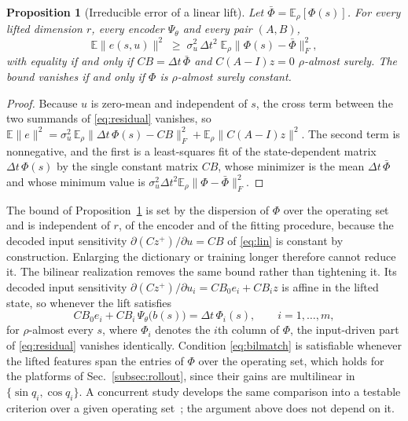 \documentclass[letterpaper,10pt,conference]{ieeeconf}
\newtheorem{proposition}{Proposition}
\begin{document}
\begin{proposition}[Irreducible error of a linear lift]\label{prop:linear}
Let $\bar\Phi = \mathbb{E}_{\rho}[\Phi(s)]$. For every lifted dimension $r$, every encoder $\Psi_\theta$ and every pair $(A, B)$,
\begin{equation}
\mathbb{E}\big\| e(s,u) \big\|^{2}
\;\ge\; \sigma_u^{2}\, \Delta t^{2}\;
\mathbb{E}_{\rho} \big\| \Phi(s) - \bar\Phi \big\|_{F}^{2},
\label{eq:linbound}
\end{equation}
with equality if and only if $C B = \Delta t\, \bar\Phi$ and $C(A-I)z = 0$ $\rho$-almost surely. The bound vanishes if and only if $\Phi$ is $\rho$-almost surely constant.
\end{proposition}
\begin{proof}
Because $u$ is zero-mean and independent of $s$, the cross term between the two summands of \eqref{eq:residual} vanishes, so
$\mathbb{E}\|e\|^{2} = \sigma_u^{2}\,\mathbb{E}_{\rho}\|\Delta t\,\Phi(s) - CB\|_{F}^{2} + \mathbb{E}_{\rho}\|C(A-I)z\|^{2}$.
The second term is nonnegative, and the first is a least-squares fit of the state-dependent matrix $\Delta t\,\Phi(s)$ by the single constant matrix $CB$, whose minimizer is the mean $\Delta t\,\bar\Phi$ and whose minimum value is $\sigma_u^{2}\Delta t^{2}\mathbb{E}_{\rho}\|\Phi - \bar\Phi\|_{F}^{2}$.
\end{proof}

The bound of Proposition~\ref{prop:linear} is set by the dispersion of $\Phi$ over the operating set and is independent of $r$, of the encoder and of the fitting procedure, because the decoded input sensitivity $\partial (Cz^{+})/\partial u = CB$ of \eqref{eq:lin} is constant by construction.
Enlarging the dictionary or training longer therefore cannot reduce it.
The bilinear realization removes the same bound rather than tightening it.
Its decoded input sensitivity $\partial (Cz^{+})/\partial u_i = C B_0 e_i + C B_i z$ is affine in the lifted state, so whenever the lift satisfies
\begin{equation}
C B_0 e_i + C B_i\, \Psi_\theta\big(b(s)\big) = \Delta t\, \Phi_i(s),
\qquad i = 1, \dots, m,
\label{eq:bilmatch}
\end{equation}
for $\rho$-almost every $s$, where $\Phi_i$ denotes the $i$th column of $\Phi$, the input-driven part of \eqref{eq:residual} vanishes identically.
Condition \eqref{eq:bilmatch} is satisfiable whenever the lifted features span the entries of $\Phi$ over the operating set, which holds for the platforms of Sec.~\ref{subsec:rollout}, since their gains are multilinear in $\{\sin q_i, \cos q_i\}$.
A concurrent study develops the same comparison into a testable criterion over a given operating set~\cite{kim2026bilinear}; the argument above does not depend on it.
\end{document}
